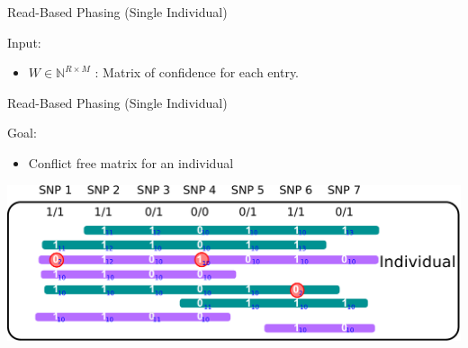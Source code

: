 \documentclass[notes=hide]{beamer}
\newcommand{\RR}{\mathbb{N}}
\begin{document}
\begin{frame}{Read-Based Phasing (Single Individual)}
	\begin{center}
\begin{block}{Input:}
		\begin{itemize}
		\color{blue}	\item $W \in \RR^{R \times M}$ : Matrix of confidence for each entry.

		\end{itemize}
	\end{block}
		\bigskip
		\bigskip
         \vspace*{1.9mm}
\end{center}
\end{frame}

\begin{frame}{Read-Based Phasing (Single Individual)}
	\vspace*{1.3mm}
	\begin{center}
		\begin{block}{Goal:}
			\begin{itemize}
				\item Conflict free matrix for an individual				
			\end{itemize}
		\end{block}
		\bigskip
		\bigskip
		\vspace*{2.23mm}
		\includegraphics[scale=0.35]{figs/sih-phasing-complete4.pdf}
	\end{center}
\end{frame}
\end{document}
